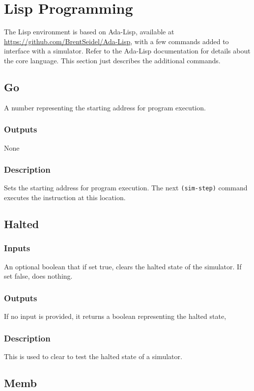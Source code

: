 \documentclass[10pt, openany]{book}
\begin{document}
\section{Lisp Programming}
The Lisp environment is based on Ada-Lisp, available at \url{https://github.com/BrentSeidel/Ada-Lisp}, with a few commands added to interface with a simulator.  Refer to the Ada-Lisp documentation for details about the core language.  This section just describes the additional commands.

\subsection{Go}
A number representing the starting address for program execution.
\subsubsection{Outputs}
None
\subsubsection{Description}
Sets the starting address for program execution.  The next \verb|(sim-step)| command executes the instruction at this location.

\subsection{Halted}
\subsubsection{Inputs}
An optional boolean that if set true, clears the halted state of the simulator.  If set false, does nothing.
\subsubsection{Outputs}
If no input is provided, it returns a boolean representing the halted state, 
\subsubsection{Description}
This is used to clear to test the halted state of a simulator.

\subsection{Memb}
\end{document}
